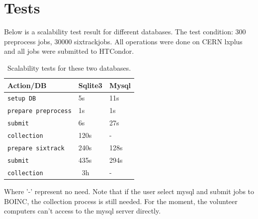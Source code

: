 \section{Tests}

Below is a scalability test result for different databases. The test condition: 300 preprocess jobs, 30000 sixtrackjobs. All operations were done on CERN lxplus and all jobs were submitted to HTCondor.
\begin{table}[h]
    \caption{Scalability tests for these two databases.}
    \label{T-ExtRou}
    \centering
    \renewcommand{\arraystretch}{1.5}
    \begin{tabular}{|l|l|l|}
        \hline
        \rowcolor{blue!30}
        \textbf{Action/DB} & \textbf{Sqlite3} & \textbf{Mysql} \\
        \hline
        \texttt{setup DB}  & 5s & 11s \\
        \hline
        \texttt{prepare preprocess}  & 1s & 1s \\
        \hline
        \texttt{submit}   & 6s    & 27s \\
        \hline
        \texttt{collection}   & 120s   & - \\
        \hline
        \texttt{prepare sixtrack}  & 240s & 128s \\
        \hline
        \texttt{submit}   & 435s    & 294s \\
        \hline
        \texttt{collection}   & ~3h   & - \\
        \hline
    \end{tabular}
\end{table}

Where '-' represent no need.
Note that if the user select mysql and submit jobs to BOINC, the collection process is still needed. For the moment, the volunteer computers can't access to the mysql server directly.

%
%
